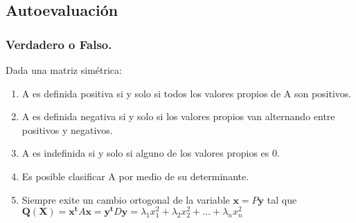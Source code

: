  \subsection{ Autoevaluación}
 \label{Auto5}
 \bigskip



\subsubsection{Verdadero o Falso.}


 \bigskip
 
Dada una matriz simétrica:

\begin{enumerate}


 \item 
A es definida positiva si y solo si todos los valores propios de A son positivos.
\item
A es definida negativa si y solo si los valores propios van alternando entre positivos y negativos.
\item
A es indefinida si y solo si alguno de los valores propios es 0.
\item
Es posible clasificar A por medio de su determinante.
\item
Siempre exite un cambio ortogonal de la variable $\mathbf{x}=P\mathbf{y}$ tal que
$\mathbf{Q}(\mathbf{X})=\mathbf{x^t}A\mathbf{x}=\mathbf{y^t}D\mathbf{y}=\lambda_1x^2_1+\lambda_2x^2_2 + ... +\lambda_nx^2_n$
\end{enumerate}

